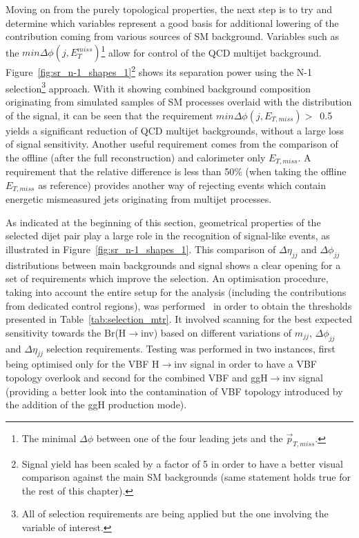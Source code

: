 \hspace{10pt} Moving on from the purely topological properties, the next step is to try and determine which variables represent a good basis for additional lowering of the contribution coming from various sources of SM background. Variables such as the $min \Delta \phi (j, E_T^{miss})$\footnote{The minimal $\Delta\phi$ between one of the four leading jets and the $\vec{p}_{T, miss}$.} allow for control of the QCD multijet background. Figure~\ref{fig:sr_n-1_shapes_1}\footnote{Signal yield has been scaled by a factor of 5 in order to have a better visual comparison against the main SM backgrounds (same statement holds true for the rest of this chapter).} shows its separation power using the N-1 selection\footnote{All of selection requirements are being applied but the one involving the variable of interest.} approach. With it showing combined background composition originating from simulated samples of SM processes overlaid with the distribution of the signal, it can be seen that the requirement $min \Delta \phi (j, E_{T,miss})>$~0.5 yields a significant reduction of QCD multijet backgrounds, without a large loss of signal sensitivity. Another useful requirement comes from the comparison of the offline (after the full reconstruction) and calorimeter only $E_{T,miss}$. A requirement that the relative difference is less than 50\% (when taking the offline $E_{T,miss}$ as reference) provides another way of rejecting events which contain energetic mismeasured jets originating from multijet processes. 

\hspace{10pt} As indicated at the beginning of this section, geometrical properties of the selected dijet pair play a large role in the recognition of signal-like events, as illustrated in Figure~\ref{fig:sr_n-1_shapes_1}. This comparison of $\Delta \eta_{jj}$ and $\Delta \phi_{jj}$ distributions between main backgrounds and signal shows a clear opening for a set of requirements which improve the selection. An optimisation procedure, taking into account the entire setup for the analysis (including the contributions from dedicated control regions), was performed~\cite{paper:HIG_17_023} in order to obtain the thresholds presented in Table~\ref{tab:selection_mtr}. It involved scanning for the best expected sensitivity towards the Br(H$\rightarrow$inv) based on different variations of $m_{jj}$, $\Delta\phi_{jj}$ and $\Delta\eta_{jj}$ selection requirements. Testing was performed in two instances, first being optimised only for the VBF H$\rightarrow$inv signal in order to have a VBF topology overlook and second for the combined VBF and ggH$\rightarrow$inv signal (providing a better look into the contamination of VBF topology introduced by the addition of the ggH production mode).

